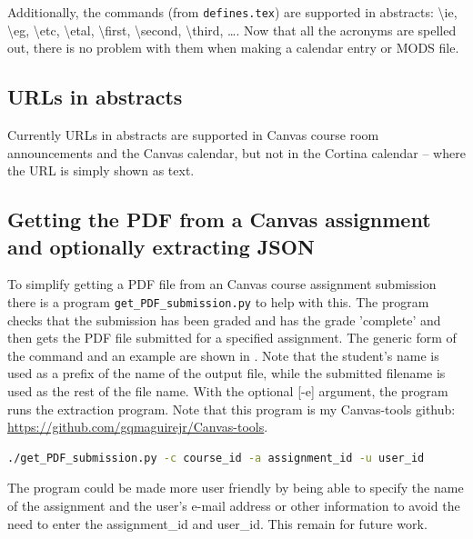 Additionally, the commands (from \texttt{defines.tex}) are supported in abstracts: \textbackslash ie, \textbackslash eg, \textbackslash etc, \textbackslash etal, \textbackslash first, \textbackslash second, \textbackslash third, \ldots . Now that all the acronyms are spelled out, there is no problem with them when making a calendar entry or MODS file.

\subsection{URLs in abstracts}
\label{sec:URLSinAbstracts}
Currently URLs in abstracts are supported in Canvas course room announcements and the Canvas calendar, but not in the Cortina calendar – where the URL is simply shown as text.

\subsection{Getting the PDF from a Canvas assignment and optionally extracting JSON}
\label{sec:gettingPDFfromCanvasAssignment}

To simplify getting a PDF file from an Canvas course assignment submission there is a program \texttt{get\_PDF\_submission.py} to help with this.  The program checks that the submission has been graded and has the grade 'complete' and then gets the PDF file submitted for a specified assignment. The generic form of the command and an example are shown in . Note that the student's name is used as a prefix of the name of the output file, while the submitted filename is used as the rest of the file name. With the optional [-e] argument, the program runs the extraction program. Note that this program is my Canvas-tools github: \url{https://github.com/gqmaguirejr/Canvas-tools}. 
\begin{lstlisting}[language={bash}, caption={get\_PDF\_submission program}, label=lst:getPDFsumbission]
./get_PDF_submission.py -c course_id -a assignment_id -u user_id
\end{lstlisting}

The program could be made more user friendly by being able to specify the name of the assignment and the user’s e-mail address or other information to avoid the need to enter the assignment\_id and user\_id. This remain for future work.

